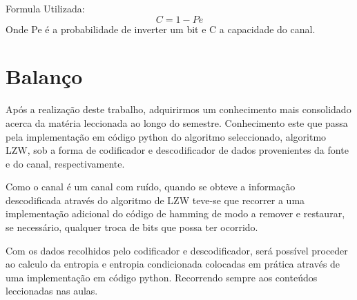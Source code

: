 \documentclass{article}
\begin{document}
\begin{titlepage}
	 \vspace{0.5cm}\indent Formula Utilizada: 
        \indent\[ C = 1-Pe\] 
        \indent Onde Pe é a probabilidade de inverter um bit e C a capacidade do canal.
    
\clearpage

\section{Balanço}
    Após a realização deste trabalho, adquirirmos um conhecimento mais consolidado acerca da matéria leccionada ao longo do semestre. Conhecimento este que passa pela implementação em código python do algoritmo seleccionado, algoritmo LZW, sob a forma de codificador e descodificador de dados provenientes da fonte e do canal, respectivamente.
    
    \vspace{1cm}\indent Como o canal é um canal com ruído, quando se obteve a informação descodificada através do algoritmo de LZW teve-se que recorrer a uma implementação adicional do código de hamming de modo a remover e restaurar, se necessário, qualquer troca de bits que possa ter ocorrido.
    
    \vspace{1cm}\indent Com os dados recolhidos pelo codificador e descodificador, será possível proceder ao calculo da entropia e entropia condicionada colocadas em prática através de uma implementação em código python. Recorrendo sempre aos conteúdos leccionadas nas aulas.
    
\clearpage
\end{titlepage}
\end{document}
